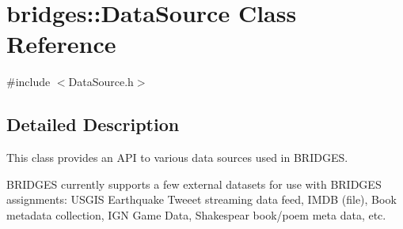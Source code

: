 \hypertarget{classbridges_1_1_data_source}{}\section{bridges\+:\+:Data\+Source Class Reference}
\label{classbridges_1_1_data_source}


{\ttfamily \#include $<$Data\+Source.\+h$>$}



\subsection{Detailed Description}
This class provides an A\+PI to various data sources used in B\+R\+I\+D\+G\+ES. 

B\+R\+I\+D\+G\+ES currently supports a few external datasets for use with B\+R\+I\+D\+G\+ES assignments\+: U\+S\+G\+IS Earthquake Tweeet streaming data feed, I\+M\+DB (file), Book metadata collection, I\+GN Game Data, Shakespear book/poem meta data, etc.

